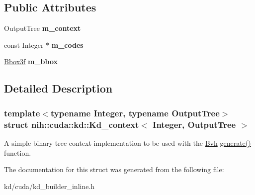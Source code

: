 \subsection*{\-Public \-Attributes}
\begin{DoxyCompactItemize}
\item 
\hypertarget{structnih_1_1cuda_1_1kd_1_1_kd__context_a694aa7947adb74b84cea3f7e45a2a488}{
\-Output\-Tree {\bfseries m\-\_\-context}}
\label{structnih_1_1cuda_1_1kd_1_1_kd__context_a694aa7947adb74b84cea3f7e45a2a488}

\item 
\hypertarget{structnih_1_1cuda_1_1kd_1_1_kd__context_a13350015a77fa296f473f82cbd0cb95e}{
const \-Integer $\ast$ {\bfseries m\-\_\-codes}}
\label{structnih_1_1cuda_1_1kd_1_1_kd__context_a13350015a77fa296f473f82cbd0cb95e}

\item 
\hypertarget{structnih_1_1cuda_1_1kd_1_1_kd__context_a98d097e5c1523dfa7599772e70b1f0bc}{
\hyperlink{structnih_1_1_bbox}{\-Bbox3f} {\bfseries m\-\_\-bbox}}
\label{structnih_1_1cuda_1_1kd_1_1_kd__context_a98d097e5c1523dfa7599772e70b1f0bc}

\end{DoxyCompactItemize}


\subsection{\-Detailed \-Description}
\subsubsection*{template$<$typename Integer, typename Output\-Tree$>$struct nih\-::cuda\-::kd\-::\-Kd\-\_\-context$<$ Integer, Output\-Tree $>$}

\-A simple binary tree context implementation to be used with the \hyperlink{structnih_1_1_bvh}{\-Bvh} \hyperlink{group__bintree_gad76a50ae08ab4d525f748a7cbcc0fb6e}{generate()} function. 

\-The documentation for this struct was generated from the following file\-:\begin{DoxyCompactItemize}
\item 
kd/cuda/kd\-\_\-builder\-\_\-inline.\-h\end{DoxyCompactItemize}
